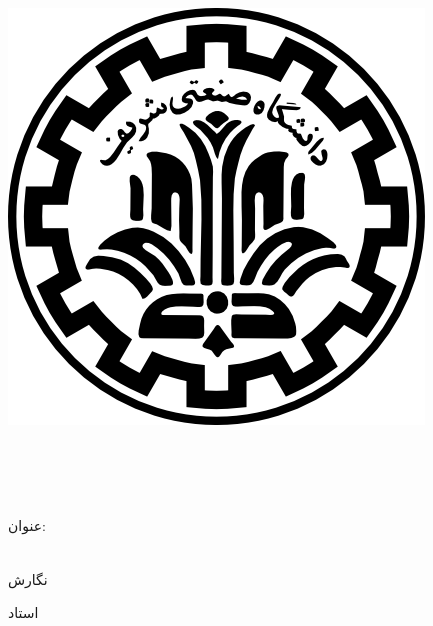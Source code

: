 
\begin{center}

\includegraphics[scale=0.2]{front/template/images/logo.png}

\vspace{-0.2cm}
\ThesisUniversity \\[-0.3em]
\ThesisDepartment\\
\ThesisType  \ \ThesisDegree \\[-0.3em]

\begin{large}
\vspace{0.5cm}



\end{large}

\vspace{1.5cm}

{عنوان:}\\[1.2em]
{\LARGE\textbf{\ThesisTitle}}\\ 
\vspace{1cm}
\begin{latin}
{\Large\textbf\EnglishThesisTitle}
\end{latin}

\vspace{2cm}

{نگارش}\\[.5em]
{\large\textbf{\ThesisAuthor}}

\vspace{0.7cm}

{استاد}\\[.5em]
{\large\textbf{\ThesisSupervisor}}

\vspace{0.7cm}


\vspace{1.2cm}

\ThesisDate

\end{center}

\newpage
